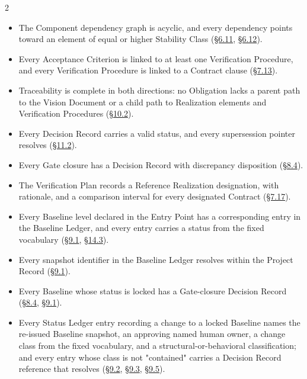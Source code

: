\begin{multicols}{2}
\begin{itemize}
\item The Component dependency graph is acyclic, and every dependency points toward an element of equal or higher Stability Class (\hyperlink{nss-6.11}{\S6.11}, \hyperlink{nss-6.12}{\S6.12}).

\item Every Acceptance Criterion is linked to at least one Verification Procedure, and every Verification Procedure is linked to a Contract clause (\hyperlink{nss-7.13}{\S7.13}).

\item Traceability is complete in both directions: no Obligation lacks a parent path to the Vision Document or a child path to Realization elements and Verification Procedures (\hyperlink{nss-10.2}{\S10.2}).

\item Every Decision Record carries a valid status, and every supersession pointer resolves (\hyperlink{nss-11.2}{\S11.2}).

\item Every Gate closure has a Decision Record with discrepancy disposition (\hyperlink{nss-8.4}{\S8.4}).

\item The Verification Plan records a Reference Realization designation, with rationale, and a comparison interval for every designated Contract (\hyperlink{nss-7.17}{\S7.17}).

\item Every Baseline level declared in the Entry Point has a corresponding entry in the Baseline Ledger, and every entry carries a status from the fixed vocabulary (\hyperlink{nss-9.1}{\S9.1}, \hyperlink{nss-14.3}{\S14.3}).

\item Every snapshot identifier in the Baseline Ledger resolves within the Project Record (\hyperlink{nss-9.1}{\S9.1}).

\item Every Baseline whose status is locked has a Gate-closure Decision Record (\hyperlink{nss-8.4}{\S8.4}, \hyperlink{nss-9.1}{\S9.1}).

\item Every Status Ledger entry recording a change to a locked Baseline names the re-issued Baseline snapshot, an approving named human owner, a change class from the fixed vocabulary, and a structural-or-behavioral classification; and every entry whose class is not "contained" carries a Decision Record reference that resolves (\hyperlink{nss-9.2}{\S9.2}, \hyperlink{nss-9.3}{\S9.3}, \hyperlink{nss-9.5}{\S9.5}).


\end{itemize}
\end{multicols}
